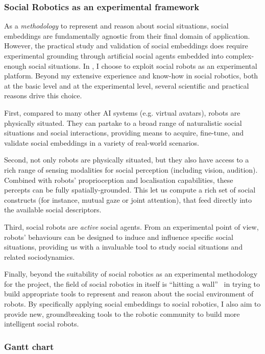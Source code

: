 \subsubsection{Social Robotics as an experimental framework}

As a \emph{methodology} to represent and reason about social situations, social
embeddings are fundamentally agnostic from their final domain of application.
However, the practical study and validation of social embeddings does require
experimental grounding through artificial social agents embedded into
complex-enough social situations. In \project, I choose to exploit social robots
as an experimental platform.  Beyond my extensive experience and know-how in
social robotics, both at the basic level and at the experimental level, several
scientific and practical reasons drive this choice.

First, compared to many other AI systems (e.g. virtual avatars), robots
are physically situated.  They can partake to a broad range of naturalistic
social situations and social interactions, providing means to acquire,
fine-tune, and validate social embeddings in a variety of real-world scenarios.

Second, not only robots are physically situated, but they also have access to a rich
range of sensing modalities for social perception (including vision, audition).
Combined with robots' proprioception and localisation capabilities, these
percepts can be fully spatially-grounded. This let us compute a rich set of
social constructs (for instance, mutual gaze or joint attention), that feed
directly into the available social descriptors.

Third, social robots are \emph{active} social agents. From an experimental point
of view, robots' behaviours can be
designed to induce and influence specific social situations, providing us with a
invaluable tool to study social situations and related sociodynamics.

Finally, beyond the suitability of social robotics as an experimental
methodology for the \project project, the field of social robotics in itself is
``hitting a wall''~\cite{yang2018grand} in trying to build appropriate tools to represent and
reason about the social environment of robots. By specifically applying social
embeddings to social robotics, I also aim to provide new, groundbreaking
tools to the robotic community to build more intelligent social robots.

\subsubsection{Gantt chart}

